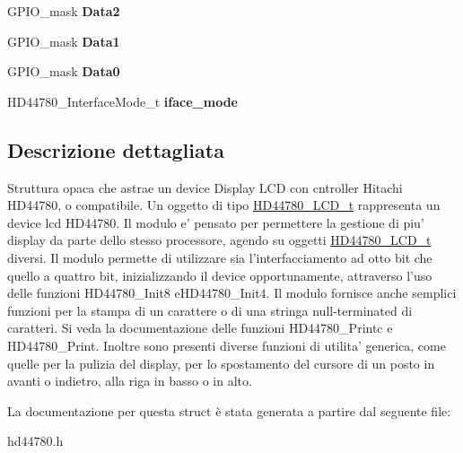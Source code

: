 \begin{DoxyCompactItemize}
\item 
\hypertarget{struct_h_d44780___l_c_d__t_afb22274224118a94688f1809cda55501}{G\+P\+I\+O\+\_\+mask {\bfseries Data2}}\label{struct_h_d44780___l_c_d__t_afb22274224118a94688f1809cda55501}

\item 
\hypertarget{struct_h_d44780___l_c_d__t_a9b310a22b76c920feb015a3a3084b125}{G\+P\+I\+O\+\_\+mask {\bfseries Data1}}\label{struct_h_d44780___l_c_d__t_a9b310a22b76c920feb015a3a3084b125}

\item 
\hypertarget{struct_h_d44780___l_c_d__t_aed1ef3393be1a14aa7b2644585e5bb08}{G\+P\+I\+O\+\_\+mask {\bfseries Data0}}\label{struct_h_d44780___l_c_d__t_aed1ef3393be1a14aa7b2644585e5bb08}

\item 
\hypertarget{struct_h_d44780___l_c_d__t_a7c5a51b8cc5de5ee2cf42b884bd1bc67}{H\+D44780\+\_\+\+Interface\+Mode\+\_\+t {\bfseries iface\+\_\+mode}}\label{struct_h_d44780___l_c_d__t_a7c5a51b8cc5de5ee2cf42b884bd1bc67}

\end{DoxyCompactItemize}


\subsection{Descrizione dettagliata}
Struttura opaca che astrae un device Display L\+C\+D con cntroller Hitachi H\+D44780, o compatibile. Un oggetto di tipo \hyperlink{struct_h_d44780___l_c_d__t}{H\+D44780\+\_\+\+L\+C\+D\+\_\+t} rappresenta un device lcd H\+D44780. Il modulo e' pensato per permettere la gestione di piu' display da parte dello stesso processore, agendo su oggetti \hyperlink{struct_h_d44780___l_c_d__t}{H\+D44780\+\_\+\+L\+C\+D\+\_\+t} diversi. Il modulo permette di utilizzare sia l'interfacciamento ad otto bit che quello a quattro bit, inizializzando il device opportunamente, attraverso l'uso delle funzioni H\+D44780\+\_\+\+Init8 e\+H\+D44780\+\_\+\+Init4. Il modulo fornisce anche semplici funzioni per la stampa di un carattere o di una stringa null-\/terminated di caratteri. Si veda la documentazione delle funzioni H\+D44780\+\_\+\+Printc e H\+D44780\+\_\+\+Print. Inoltre sono presenti diverse funzioni di utilita' generica, come quelle per la pulizia del display, per lo spostamento del cursore di un posto in avanti o indietro, alla riga in basso o in alto. 

La documentazione per questa struct è stata generata a partire dal seguente file\+:\begin{DoxyCompactItemize}
\item 
hd44780.\+h\end{DoxyCompactItemize}
